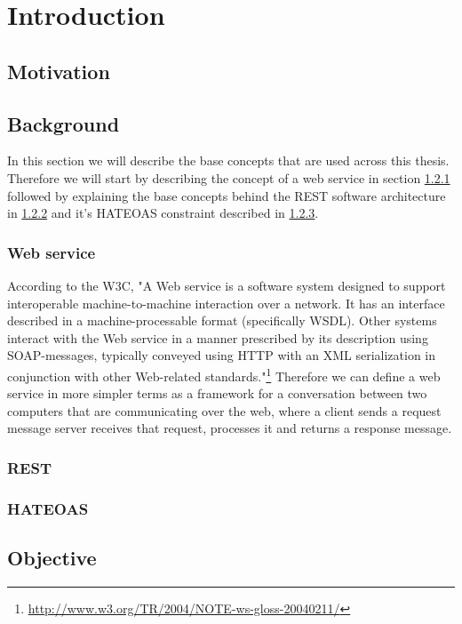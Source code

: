 \chapter{Introduction}
\label{chapter:intro}

\section{Motivation}
\label{sec:motivation}


\section{Background}
\label{sec:background}

In this section we will describe the base concepts that are used across this thesis. Therefore we will start by describing the concept of a web service in section \ref{sub-sec:web-service} followed by explaining the base concepts behind the REST software architecture in \ref{sub-sec:rest} and it's HATEOAS constraint described in \ref{sub-sec:hateoas}.

\subsection{Web service}
\label{sub-sec:web-service}

According to the W3C, "A Web service is a software system designed to support interoperable machine-to-machine interaction over a network. It has an interface described in a machine-processable format (specifically WSDL). Other systems interact with the Web service in a manner prescribed by its description using SOAP-messages, typically conveyed using HTTP with an XML serialization in conjunction with other Web-related standards."\footnote{\url{http://www.w3.org/TR/2004/NOTE-ws-gloss-20040211/}} Therefore we can define a web service in more simpler terms as a framework for a conversation between two computers that are communicating over the web, where a client sends a request message server receives that request, processes it and returns a response message.


\subsection{REST}
\label{sub-sec:rest}



\subsection{HATEOAS}
\label{sub-sec:hateoas}



\section{Objective}
\label{sec:objective}

